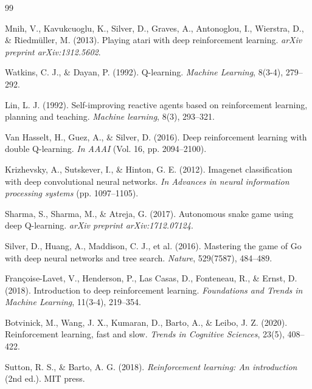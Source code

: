\documentclass[10pt,a4paper,twocolumn]{article}
\begin{document}
\begin{thebibliography}{99}

Mnih, V., Kavukcuoglu, K., Silver, D., Graves, A., Antonoglou, I., Wierstra, D., \& Riedmüller, M. (2013).
\newblock Playing atari with deep reinforcement learning.
\newblock \emph{arXiv preprint arXiv:1312.5602}.

Watkins, C. J., \& Dayan, P. (1992).
\newblock Q-learning.
\newblock \emph{Machine Learning}, 8(3-4), 279--292.

Lin, L. J. (1992).
\newblock Self-improving reactive agents based on reinforcement learning, planning and teaching.
\newblock \emph{Machine learning}, 8(3), 293--321.

Van Hasselt, H., Guez, A., \& Silver, D. (2016).
\newblock Deep reinforcement learning with double Q-learning.
\newblock \emph{In AAAI} (Vol. 16, pp. 2094--2100).

Krizhevsky, A., Sutskever, I., \& Hinton, G. E. (2012).
\newblock Imagenet classification with deep convolutional neural networks.
\newblock \emph{In Advances in neural information processing systems} (pp. 1097--1105).

Sharma, S., Sharma, M., \& Atreja, G. (2017).
\newblock Autonomous snake game using deep Q-learning.
\newblock \emph{arXiv preprint arXiv:1712.07124}.

Silver, D., Huang, A., Maddison, C. J., et al. (2016).
\newblock Mastering the game of Go with deep neural networks and tree search.
\newblock \emph{Nature}, 529(7587), 484--489.

Françoise-Lavet, V., Henderson, P., Las Casas, D., Fonteneau, R., \& Ernst, D. (2018).
\newblock Introduction to deep reinforcement learning.
\newblock \emph{Foundations and Trends in Machine Learning}, 11(3-4), 219--354.

Botvinick, M., Wang, J. X., Kumaran, D., Barto, A., \& Leibo, J. Z. (2020).
\newblock Reinforcement learning, fast and slow.
\newblock \emph{Trends in Cognitive Sciences}, 23(5), 408--422.

Sutton, R. S., \& Barto, A. G. (2018).
\newblock \emph{Reinforcement learning: An introduction} (2nd ed.).
\newblock MIT press.

\end{thebibliography}
\end{document}
